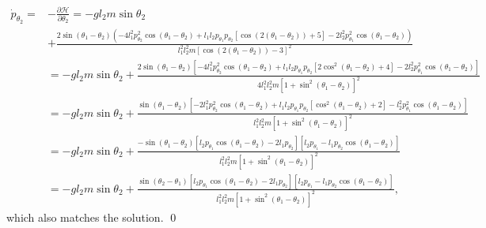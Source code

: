\documentclass{article}
\theoremstyle{definition}
\newcommand{\p}{\partial}
\newcommand{\ham}{\mathcal{H}}
\newcommand{\f}[2]{\frac{#1}{#2}}
\newcommand{\lb}{\left[}
\newcommand{\rb}{\right]}
\begin{document}
\begin{align*}
\dot{p}_{\theta_2} = &-\f{\p \ham}{\p \theta_2}
= - g l_2 m \sin\theta_2 \\
&+\frac{2 \sin (\theta_1-\theta_2) \left(-4
	l_1^2 p_{\theta_2}^2 \cos (\theta_1-\theta_2)+l_1 l_2 p_{\theta_1}p_{\theta_2} [\cos (2 (\theta_1-\theta_2))+5]-2 l_2^2 p_{\theta_1}^2 \cos (\theta_1-\theta_2)\right)}{l_1^2 l_2^2 m [\cos (2 (\theta_1-\theta_2))-3]^2}\\
&= - g l_2 m \sin\theta_2 + \f{2\sin(\theta_1-\theta_2)
	\lb -4
	l_1^2 p_{\theta_2}^2 \cos (\theta_1-\theta_2)+l_1 l_2 p_{\theta_1}p_{\theta_2} [2\cos^2( \theta_1-\theta_2)+4]-2 l_2^2 p_{\theta_1}^2 \cos (\theta_1-\theta_2) \rb
}{4l_1^2l_2^2m[1+\sin^2(\theta_1-\theta_2)]^2}\\
&= - g l_2 m \sin\theta_2 + \f{\sin(\theta_1-\theta_2)
	\lb -2
	l_1^2 p_{\theta_2}^2 \cos (\theta_1-\theta_2)+l_1 l_2 p_{\theta_1}p_{\theta_2} [\cos^2( \theta_1-\theta_2)+2]- l_2^2 p_{\theta_1}^2 \cos (\theta_1-\theta_2) \rb
}{l_1^2l_2^2m[1+\sin^2(\theta_1-\theta_2)]^2}\\
&= - g l_2 m \sin\theta_2 + \f{-\sin(\theta_1-\theta_2)
	\lb l_2p_{\theta_1}\cos(\theta_1-\theta_2) -2l_1p_{\theta_2} \rb 
	\lb l_2p_{\theta_1} - l_1p_{\theta_2}\cos(\theta_1-\theta_2) \rb
}{l_1^2l_2^2m[1+\sin^2(\theta_1-\theta_2)]^2}\\
&= - g l_2 m \sin\theta_2 + \f{\sin(\theta_2-\theta_1)
	\lb l_2p_{\theta_1}\cos(\theta_1-\theta_2) -2l_1p_{\theta_2} \rb 
	\lb l_2p_{\theta_1} - l_1p_{\theta_2}\cos(\theta_1-\theta_2) \rb
}{l_1^2l_2^2m[1+\sin^2(\theta_1-\theta_2)]^2},
\end{align*}
which also matches the solution. \qed


	
	
	
\end{document}
